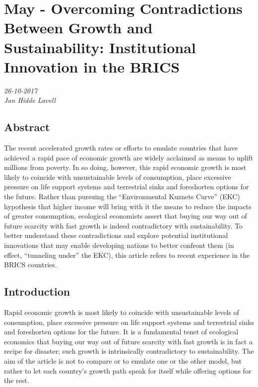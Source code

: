 \chapter{May - Overcoming Contradictions Between Growth and Sustainability: Institutional Innovation in the BRICS}
\textit{26-10-2017 \\
Jan Hidde Lavell} 

\section{Abstract}
The recent accelerated growth rates or efforts to emulate countries that have achieved a rapid pace of economic growth are widely acclaimed as means to uplift millions from poverty. In so doing, however, this rapid economic growth is most likely to coincide with unsustainable levels of consumption, place excessive pressure on life support systems and terrestrial sinks and foreshorten options for the future. Rather than pursuing the “Environmental Kuznets Curve” (EKC) hypothesis that higher income will bring with it the means to reduce the impacts of greater consumption, ecological economists assert that buying our way out of future scarcity with fast growth is indeed contradictory with sustainability. To better understand these contradictions and explore potential institutional innovations that may enable developing nations to
better confront them (in effect, “tunneling under” the EKC), this article refers to recent experience in the BRICS countries. 

\section{Introduction}
Rapid economic growth is most likely to coincide with unsustainable levels of consumption, place excessive pressure on life support systems and terrestrial sinks and foreshorten options for the future. It is a fundamental tenet of ecological economics that buying our way out of future scarcity with fast growth is in fact a recipe for disaster; such growth is intrinsically contradictory to sustainability. The aim of the article is not to compare or to emulate one or the other model, but rather to let each country’s growth path speak for itself while offering options for the rest.

